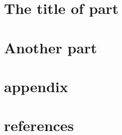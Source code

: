\documentclass[12pt,twoside,table]{book}
\begin{document}

%




\part{The title of part}
\label{part:nxfem}


%


\part{Another part}
\label{part:nxfem-biofilm}


\part*{appendix}

\appendix




\backmatter %

\endgroup %


\part*{references}

\listoffigures %

\listoftables %

\listofalgorithms
{}


\end{document}

